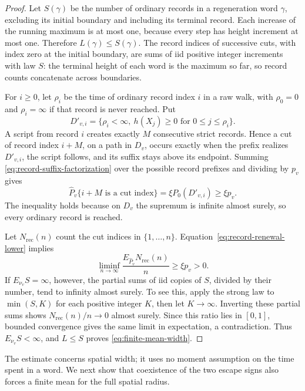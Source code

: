 \begin{proof}
Let \(S(\gamma)\) be the number of ordinary records in a regeneration
word \(\gamma\), excluding its initial boundary and including its
terminal record.  Each increase of the running maximum is at most one,
because every step has height increment at most one.  Therefore
\(L(\gamma)\le S(\gamma)\).  The record indices of successive cuts,
with index zero at the initial boundary, are sums of iid positive
integer increments with law \(S\): the terminal height of each word
is the maximum so far, so record counts concatenate across boundaries.

For \(i\ge0\), let \(\rho_i\) be the time of ordinary record
index \(i\) in a raw walk, with \(\rho_0=0\) and
\(\rho_i=\infty\) if that record is never reached.  Put
\[
 D'_{v,i}=\{\rho_i<\infty,\ h(X_j)\ge0
                       \text{ for }0\le j\le\rho_i\}.
\]
A script from record \(i\) creates exactly \(M\) consecutive
strict records.  Hence a cut of record index \(i+M\), on a path in
\(D_v\), occurs exactly when the prefix realizes \(D'_{v,i}\),
the script follows, and its suffix stays above its endpoint.  Summing
\eqref{eq:record-suffix-factorization} over the possible record
prefixes and dividing by \(p_v\) gives
\begin{equation}\label{eq:record-renewal-lower}
 \widehat P_v\{i+M\text{ is a cut index}\}
   =\xi P_0(D'_{v,i})\ge\xi p_v.
\end{equation}
The inequality holds because on \(D_v\) the supremum is infinite
almost surely, so every ordinary record is reached.

Let \(N_{\mathrm{rec}}(n)\) count the cut indices in \(\{1,\ldots,n\}\).
Equation~\eqref{eq:record-renewal-lower} implies
\[
 \liminf_{n\to\infty}
 \frac{E_{\widehat P_v}N_{\mathrm{rec}}(n)}{n}\ge\xi p_v>0.
\]
If \(E_{\nu_v}S=\infty\), however, the partial sums of iid copies
of \(S\), divided by their number, tend to infinity almost surely.
To see this, apply the strong law to \(\min(S,K)\) for each positive
integer \(K\), then let \(K\to\infty\).  Inverting these partial
sums shows \(N_{\mathrm{rec}}(n)/n\to0\) almost surely.  Since this
ratio lies in \([0,1]\), bounded convergence gives the same limit in
expectation, a contradiction.  Thus \(E_{\nu_v}S<\infty\), and
\(L\le S\) proves \eqref{eq:finite-mean-width}.
\end{proof}

The estimate concerns spatial width; it uses no moment assumption on
the time spent in a word.  We next show that coexistence of the two
escape signs also forces a finite mean for the full spatial radius.
